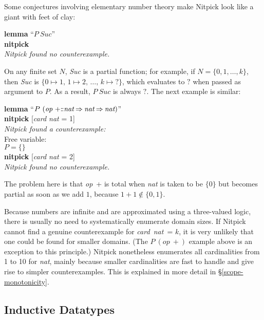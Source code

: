 \documentclass[a4paper,12pt]{article}
\def\Colon{\mathord{:\mkern-1.5mu:}}
\def\unk{{?}}
\begin{document}
Some conjectures involving elementary number theory make Nitpick look like a
giant with feet of clay:

\prew
\textbf{lemma} ``$P~\textit{Suc}$'' \\
\textbf{nitpick} \\[2\smallskipamount]
\slshape
Nitpick found no counterexample.
\postw

On any finite set $N$, \textit{Suc} is a partial function; for example, if $N =
\{0, 1, \ldots, k\}$, then \textit{Suc} is $\{0 \mapsto 1,\, 1 \mapsto 2,\,
\ldots,\, k \mapsto \unk\}$, which evaluates to $\unk$ when passed as
argument to $P$. As a result, $P~\textit{Suc}$ is always $\unk$. The next
example is similar:

\prew
\textbf{lemma} ``$P~(\textit{op}~{+}\Colon
\textit{nat}\mathbin{\Rightarrow}\textit{nat}\mathbin{\Rightarrow}\textit{nat})$'' \\
\textbf{nitpick} [\textit{card nat} = 1] \\[2\smallskipamount]
{\slshape Nitpick found a counterexample:} \\[2\smallskipamount]
\hbox{}\qquad Free variable: \nopagebreak \\
\hbox{}\qquad\qquad $P = \{\}$ \\[2\smallskipamount]
\textbf{nitpick} [\textit{card nat} = 2] \\[2\smallskipamount]
{\slshape Nitpick found no counterexample.}
\postw

The problem here is that \textit{op}~+ is total when \textit{nat} is taken to be
$\{0\}$ but becomes partial as soon as we add $1$, because $1 + 1 \notin \{0,
1\}$.

Because numbers are infinite and are approximated using a three-valued logic,
there is usually no need to systematically enumerate domain sizes. If Nitpick
cannot find a genuine counterexample for \textit{card~nat}~= $k$, it is very
unlikely that one could be found for smaller domains. (The $P~(\textit{op}~{+})$
example above is an exception to this principle.) Nitpick nonetheless enumerates
all cardinalities from 1 to 10 for \textit{nat}, mainly because smaller
cardinalities are fast to handle and give rise to simpler counterexamples. This
is explained in more detail in \S\ref{scope-monotonicity}.

\subsection{Inductive Datatypes}
\label{inductive-datatypes}
\end{document}
